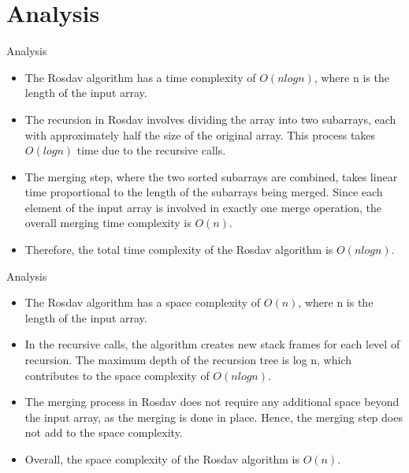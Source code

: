 \documentclass[10pt]{beamer}
\begin{document}
\section{Analysis}
\begin{frame}{Analysis}
\begin{tcolorbox}[colback=blue!5,colframe=blue!40!black,title=Time Complexity:]
\begin{itemize}
   \item The Rosdav algorithm has a time complexity of $O(n log n)$, where n is the length of the input array.
   \item The recursion in Rosdav involves dividing the array into two subarrays, each with approximately half the size of the original array. This process takes $O(log n)$ time due to the recursive calls.
   \item  The merging step, where the two sorted subarrays are combined, takes linear time proportional to the length of the subarrays being merged. Since each element of the input array is involved in exactly one merge operation, the overall merging time complexity is $O(n)$.
   \item  Therefore, the total time complexity of the Rosdav algorithm is $O(n log n)$.
\end{itemize}
\end{tcolorbox}
\end{frame}

\begin{frame}{Analysis}
\begin{tcolorbox}[colback=blue!5,colframe=blue!40!black,title=Space Complexity:] 
\begin{itemize}
   \item The Rosdav algorithm has a space complexity of $O(n)$, where n is the length of the input array.
   \item In the recursive calls, the algorithm creates new stack frames for each level of recursion. The maximum depth of the recursion tree is log n, which contributes to the space complexity of $O(n log n)$.
   \item The merging process in Rosdav does not require any additional space beyond the input array, as the merging is done in place. Hence, the merging step does not add to the space complexity.
   \item Overall, the space complexity of the Rosdav algorithm is $O(n)$.
\end{itemize}
\end{tcolorbox}
\end{frame}
\end{document}
